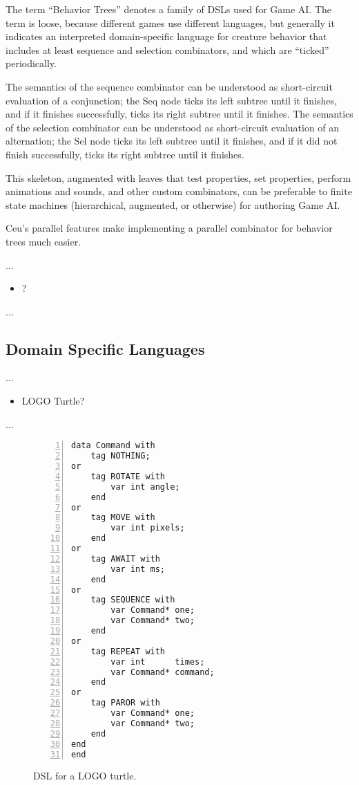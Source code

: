 \documentclass{acm_proc_article-sp}
\begin{document}
The term ``Behavior Trees'' denotes a family of DSLs 
used for Game AI.
The term is loose, because different games use different languages,
but generally it indicates an interpreted domain-specific language
for creature behavior that includes at least sequence and selection combinators,
and which are ``ticked'' periodically.

The semantics of the sequence combinator can be understood as short-circuit evaluation of a conjunction;
the Seq node ticks its left subtree until it finishes,
and if it finishes successfully, ticks its right subtree until it finishes.
The semantics of the selection combinator can be understood as short-circuit evaluation of an alternation;
the Sel node ticks its left subtree until it finishes,
and if it did not finish successfully, ticks its right subtree until it finishes.

This skeleton, augmented with leaves that test properties, set properties, perform animations and sounds,
and other custom combinators, can be preferable to finite state machines (hierarchical, augmented, or otherwise) for authoring Game AI.

Ceu's parallel features make implementing a parallel combinator for behavior trees much easier.

...

\begin{itemize}
\item ?
\end{itemize}

...

\subsection{Domain Specific Languages}

...

\begin{itemize}
\item LOGO Turtle?
\end{itemize}

...

\begin{figure}%
\begin{lstlisting}[numbers=left,xleftmargin=3em]
data Command with
    tag NOTHING;
or
    tag ROTATE with
        var int angle;
    end
or
    tag MOVE with
        var int pixels;
    end
or
    tag AWAIT with
        var int ms;
    end
or
    tag SEQUENCE with
        var Command* one;
        var Command* two;
    end
or
    tag REPEAT with
        var int      times;
        var Command* command;
    end
or
    tag PAROR with
        var Command* one;
        var Command* two;
    end
end
end
\end{lstlisting}
\caption{ DSL for a LOGO turtle.
\label{lst.turtle.dsl}
}
\end{figure}
\end{document}
